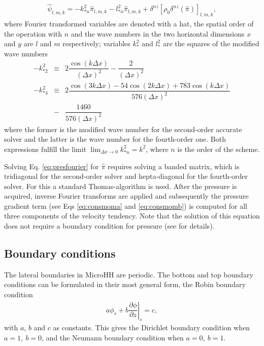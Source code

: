 \documentclass[gmd]{copernicus}
\begin{document}
\begin{eqnarray}
\widehat{\psi}_{l,m,k} = - k^2_{*n} \widehat{\pi}_{l,m,k} - l^2_{*n} \widehat{\pi}_{l,m,k}
+ \delta^{nz} \left[ \rho_0 \delta^{nz} \left( \widehat{\pi} \right) \right]_{l,m,k},\label{eq:presfourier}
\end{eqnarray}
where Fourier transformed variables are denoted with a hat, the spatial order of the operation with $n$ and the wave numbers in the two horizontal dimensions $x$ and $y$ are $l$ and $m$ respectively; variables $k_*^2$ and $l_*^2$ are the squares of the modified wave numbers
\begin{eqnarray}
-k_{*2}^2 & \equiv & 2 \dfrac{\cos (k \Delta x)}{\left( \Delta x \right)^2} - \dfrac{2}{\left( \Delta x \right)^2}\\
\nonumber
-k_{*4}^2 & \equiv & 2 \dfrac{\cos (3k \Delta x) - 54 \cos (2k \Delta x) + 783 \cos (k \Delta x)}
{576 \left( \Delta x \right)^2}\\
& - & \dfrac{1460}{576 \left( \Delta x \right)^2}
\end{eqnarray}
where the former is the modified wave number for the second-order accurate solver and the latter is the wave number for the fourth-order one. Both expressions fulfill the limit
$\lim_{\Delta x \rightarrow 0} k_{*n}^2 = k^2$, where $n$ is the order of the scheme.

Solving Eq. \ref{eq:presfourier} for $\widehat{\pi}$ requires solving a banded matrix, which is tridiagonal for the second-order solver and hepta-diagonal for the fourth-order solver. For this a standard Thomas-algorithm is used. After the pressure is acquired, inverse Fourier transforms are applied and subsequently the pressure gradient term (see Eqs \ref{eq:consmoma} and \ref{eq:consmomb}) is computed for all three components of the velocity tendency. Note that the solution of this equation does not require a boundary condition for pressure (see \citet{Vreman2014} for details).

\subsection{Boundary conditions}
The lateral boundaries in MicroHH are periodic. The bottom and top boundary conditions can be formulated in their most general form, the Robin boundary condition
\begin{eqnarray}
a \phi_s + b \left.\dfrac{\partial \phi}{\partial z}\right|_s = c,
\end{eqnarray}
with $a$, $b$ and $c$ as constants. This gives the Dirichlet boundary condition when ${a=1,~b=0}$, and the Neumann boundary condition when ${a=0,~b=1}$. 
\end{document}
